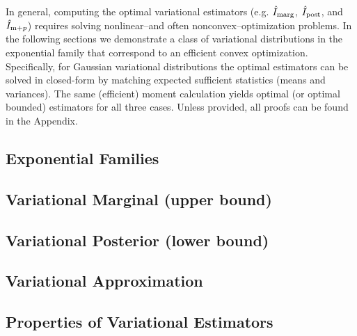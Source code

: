 
In general, computing the optimal variational estimators
(e.g. $\hat{I}_{\text{marg}}$, $\hat{I}_{\text{post}}$, and $\hat{I}_{\text{m}+p}$) requires solving nonlinear--and
often nonconvex--optimization problems.  In the following sections we
demonstrate a class of variational distributions in the exponential
family that correspond to an efficient convex optimization.
Specifically, for Gaussian variational distributions the optimal
estimators can be solved in closed-form by matching expected
sufficient statistics (means and variances).  The same
(efficient) moment calculation yields optimal (or optimal bounded)
estimators for all three cases.  Unless provided, all proofs can be found in the Appendix.

\subsection{Exponential Families}


\subsection{Variational Marginal (upper bound)}\label{sec:varmarg_opt}


\subsection{Variational Posterior (lower bound)}\label{sec:varpost_opt}


\subsection{Variational Approximation}\label{sec:varapprox_opt}


\subsection{Properties of Variational Estimators}



